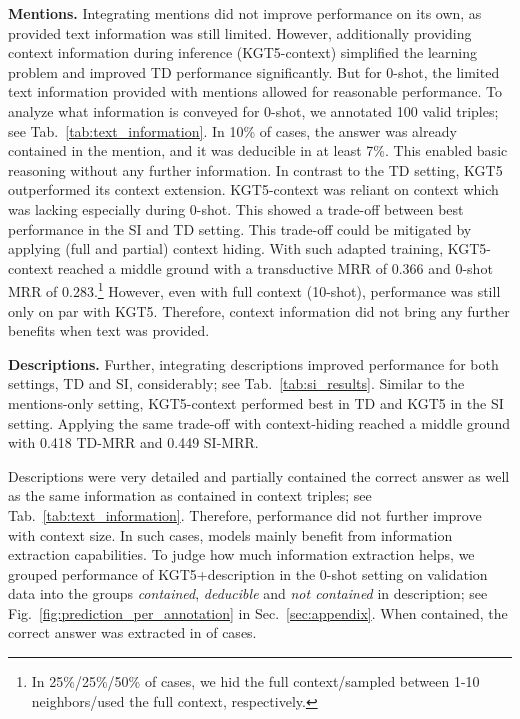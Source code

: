 \documentclass[11pt]{article}
\renewcommand\:{\colon} \newcommand{\sset}[1]{\left\{\,#1\,\right\}} \newcommand{\ssets}[1]{\left\{#1\right\}} \newcommand{\ssetn}[1]{\{\,#1\,\}}
\begin{document}
\textbf{Mentions.}
Integrating mentions did not improve performance on its own, as provided text information was still limited.
However, additionally providing context information during inference (KGT5-context) simplified the learning problem and improved TD performance significantly.
But for 0-shot, the limited text information provided with mentions allowed for reasonable performance.
To analyze what information is conveyed for 0-shot, we annotated 100 valid
triples; see Tab.~\ref{tab:text_information}. In 10\% of cases, the answer was
already contained in the mention, and it was deducible in at least 7\%. This
enabled basic reasoning without any further information. In contrast to the TD
setting, KGT5 outperformed its context extension. KGT5-context was reliant on
context which was lacking especially during 0-shot. This showed a trade-off
between best performance in the SI and TD setting. This trade-off could be
mitigated by applying (full and partial) context hiding. With such adapted
training, KGT5-context reached a middle ground with a transductive MRR of
0.366 and 0-shot MRR of 0.283.\footnote{In 25\%/25\%/50\% of cases, we hid the full
  context/sampled between 1-10 neighbors/used the full
  context, respectively.} However, even with full context (10-shot), performance was still
only on par with KGT5. Therefore, context information did not bring any further
benefits when text was provided.


\textbf{Descriptions.}
Further, integrating descriptions improved performance for both settings, TD and SI, considerably; see Tab.~\ref{tab:si_results}.
Similar to the mentions-only setting, KGT5-context performed best in TD and KGT5 in the SI setting.
Applying the same trade-off with context-hiding reached a middle ground with 0.418 TD-MRR and 0.449 SI-MRR.

Descriptions were very detailed and partially contained the correct answer as
well as the same information as contained in context triples; see
Tab.~\ref{tab:text_information}. Therefore, performance did not further improve
with context size. In such cases, models mainly benefit from information
extraction capabilities. To judge how much information extraction helps, we
grouped performance of KGT5+description in the 0-shot setting on validation data
into the groups \textit{contained}, \textit{deducible} and \textit{not
  contained} in description; see Fig.~\ref{fig:prediction_per_annotation} in
Sec.~\ref{sec:appendix}. When contained, the correct answer was extracted in
 of cases.
\end{document}
